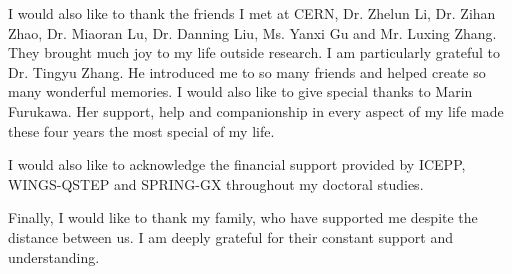 \begin{acknowledgements}
    I would also like to thank the friends I met at CERN, Dr. Zhelun Li, Dr. Zihan Zhao, Dr. Miaoran Lu, Dr. Danning Liu, Ms. Yanxi Gu and Mr. Luxing Zhang. They brought much joy to my life outside research. I am particularly grateful to Dr. Tingyu Zhang. He introduced me to so many friends and helped create so many wonderful memories. I would also like to give special thanks to Marin Furukawa. Her support, help and companionship in every aspect of my life made these four years the most special of my life.
    
    I would also like to acknowledge the financial support provided by ICEPP, WINGS-QSTEP and SPRING-GX throughout my doctoral studies.
    
    Finally, I would like to thank my family, who have supported me despite the distance between us. I am deeply grateful for their constant support and understanding.

\end{acknowledgements}
